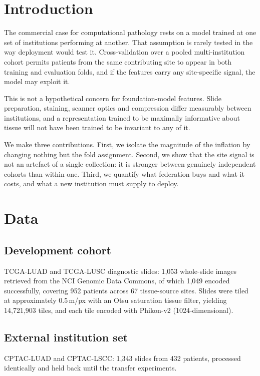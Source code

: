 \documentclass[11pt,a4paper]{article}
\begin{document}
\section{Introduction}

The commercial case for computational pathology rests on a model trained at one set of
institutions performing at another. That assumption is rarely tested in the way deployment
would test it. Cross-validation over a pooled multi-institution cohort permits patients from
the same contributing site to appear in both training and evaluation folds, and if the features
carry any site-specific signal, the model may exploit it.

This is not a hypothetical concern for foundation-model features. Slide preparation, staining,
scanner optics and compression differ measurably between institutions, and a representation
trained to be maximally informative about tissue will not have been trained to be invariant to
any of it.

We make three contributions. First, we isolate the magnitude of the inflation by changing
nothing but the fold assignment. Second, we show that the site signal is not an artefact of a
single collection: it is stronger between genuinely independent cohorts than within one.
Third, we quantify what federation buys and what it costs, and what a new institution must
supply to deploy.

\section{Data}

\subsection{Development cohort}

TCGA-LUAD and TCGA-LUSC diagnostic slides: 1{,}053 whole-slide images retrieved from the NCI
Genomic Data Commons, of which 1{,}049 encoded successfully, covering 952 patients across 67
tissue-source sites. Slides were tiled at approximately 0.5\,\textmu m/px with an Otsu
saturation tissue filter, yielding 14{,}721{,}903 tiles, and each tile encoded with Phikon-v2
(1024-dimensional).

\subsection{External institution set}

CPTAC-LUAD and CPTAC-LSCC: 1{,}343 slides from 432 patients, processed identically and held
back until the transfer experiments.
\end{document}
